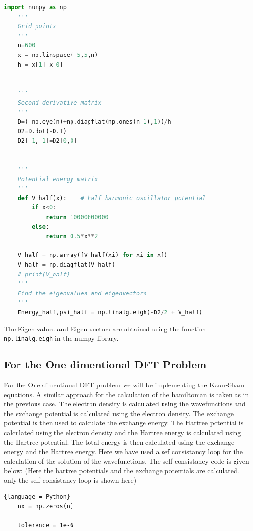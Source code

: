 \documentclass{article}
\begin{document}
\begin{multicols}{2}
\begin{lstlisting}[language=Python]
    import numpy as np
    '''
    Grid points
    '''
    n=600
    x = np.linspace(-5,5,n)
    h = x[1]-x[0] 
    
    
    '''
    Second derivative matrix
    '''
    D=(-np.eye(n)+np.diagflat(np.ones(n-1),1))/h
    D2=D.dot(-D.T)
    D2[-1,-1]=D2[0,0]
    
    
    '''
    Potential energy matrix
    '''
    def V_half(x):    # half harmonic oscillator potential
        if x<0:
            return 10000000000
        else:
            return 0.5*x**2
    
    V_half = np.array([V_half(xi) for xi in x])
    V_half = np.diagflat(V_half)
    # print(V_half)
    '''
    Find the eigenvalues and eigenvectors
    '''
    Energy_half,psi_half = np.linalg.eigh(-D2/2 + V_half)
\end{lstlisting}





The Eigen values and Eigen vectors are obtained using the  function \texttt{np.linalg.eigh} in the numpy library.



\subsection{For the One dimentional DFT Problem}

For the One dimentional DFT problem we will be implementing the Kaun-Sham equations. A similar approach for the calculation of the hamiltonian is taken as in the previous case. The electron density is calculated using the wavefunctions and the exchange potential is calculated using the electron density. The exchange potential is then used to calculate the exchange energy. The Hartree potential is calculated using the electron density and the Hartree energy is calculated using the Hartree potential. The total energy is then calculated using the exchange energy and the Hartree energy. Here we have used a sef consistancy loop for the calculation of the solution of the wavefunctions. The self consistancy code is given below: (Here the hartree potentials and the exchange potentials are calculated. only the self consistancy loop is shown here)

\begin{lstlisting}{language = Python}
    nx = np.zeros(n)

    tolerence = 1e-6
    

\end{lstlisting}
\end{multicols}
\end{document}

